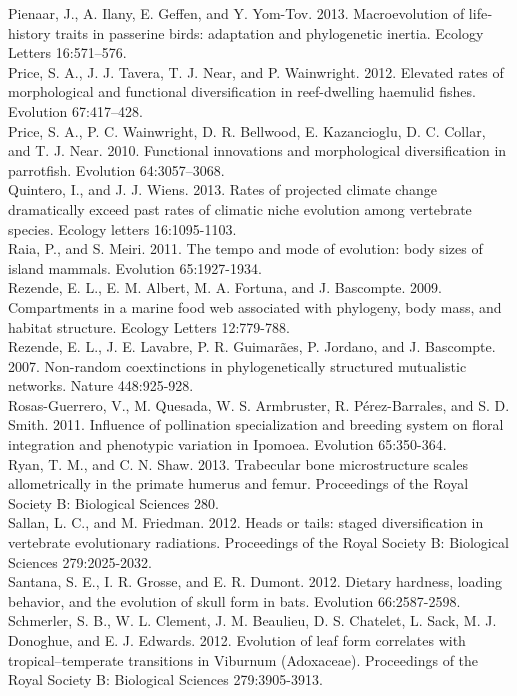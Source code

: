 Pienaar, J., A. Ilany, E. Geffen, and Y. Yom-Tov. 2013. Macroevolution of life‐history traits in passerine birds: adaptation and phylogenetic inertia. Ecology Letters 16:571–576.\\
Price, S. A., J. J. Tavera, T. J. Near, and P. Wainwright. 2012. Elevated rates of morphological and functional diversification in reef-dwelling haemulid fishes. Evolution 67:417–428.\\
Price, S. A., P. C. Wainwright, D. R. Bellwood, E. Kazancioglu, D. C. Collar, and T. J. Near. 2010. Functional innovations and morphological diversification in parrotfish. Evolution 64:3057–3068.\\
Quintero, I., and J. J. Wiens. 2013. Rates of projected climate change dramatically exceed past rates of climatic niche evolution among vertebrate species. Ecology letters 16:1095-1103.\\
Raia, P., and S. Meiri. 2011. The tempo and mode of evolution: body sizes of island mammals. Evolution 65:1927-1934.\\
Rezende, E. L., E. M. Albert, M. A. Fortuna, and J. Bascompte. 2009. Compartments in a marine food web associated with phylogeny, body mass, and habitat structure. Ecology Letters 12:779-788.\\
Rezende, E. L., J. E. Lavabre, P. R. Guimarães, P. Jordano, and J. Bascompte. 2007. Non-random coextinctions in phylogenetically structured mutualistic networks. Nature 448:925-928.\\
Rosas-Guerrero, V., M. Quesada, W. S. Armbruster, R. Pérez-Barrales, and S. D. Smith. 2011. Influence of pollination specialization and breeding system on floral integration and phenotypic variation in Ipomoea. Evolution 65:350-364.\\
Ryan, T. M., and C. N. Shaw. 2013. Trabecular bone microstructure scales allometrically in the primate humerus and femur. Proceedings of the Royal Society B: Biological Sciences 280.\\
Sallan, L. C., and M. Friedman. 2012. Heads or tails: staged diversification in vertebrate evolutionary radiations. Proceedings of the Royal Society B: Biological Sciences 279:2025-2032.\\
Santana, S. E., I. R. Grosse, and E. R. Dumont. 2012. Dietary hardness, loading behavior, and the evolution of skull form in bats. Evolution 66:2587-2598.\\
Schmerler, S. B., W. L. Clement, J. M. Beaulieu, D. S. Chatelet, L. Sack, M. J. Donoghue, and E. J. Edwards. 2012. Evolution of leaf form correlates with tropical–temperate transitions in Viburnum (Adoxaceae). Proceedings of the Royal Society B: Biological Sciences 279:3905-3913.\\
